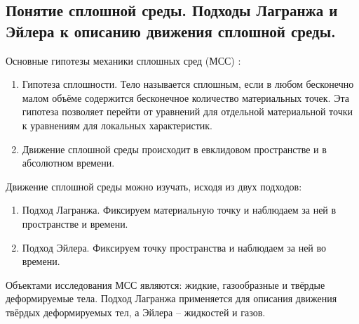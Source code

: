 \subsection{Понятие сплошной среды. Подходы Лагранжа и Эйлера к описанию движения сплошной среды.}
Основные гипотезы механики сплошных сред (МСС) \cite{Gorbachev2018-1}:
\begin{enumerate}
\item Гипотеза сплошности. Тело называется сплошным, если в любом бесконечно малом объёме содержится бесконечное количество материальных точек. Эта гипотеза позволяет перейти от уравнений для отдельной материальной точки к уравнениям для локальных характеристик.
\item Движение сплошной среды происходит в евклидовом пространстве и в абсолютном времени.
\end{enumerate}

Движение сплошной среды можно изучать, исходя из двух подходов:
\begin{enumerate}
\item Подход Лагранжа. Фиксируем материальную точку и наблюдаем за ней в пространстве и времени.
\item Подход Эйлера. Фиксируем точку пространства и наблюдаем за ней во времени.
\end{enumerate}

Объектами исследования МСС являются: жидкие, газообразные и твёрдые деформируемые тела.
Подход Лагранжа применяется для описания движения твёрдых деформируемых тел, а Эйлера -- жидкостей и газов.
